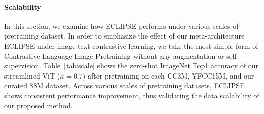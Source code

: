 \paragraph{Scalability}
In this section, we examine how ECLIPSE performs under various scales of pretraining dataset.
In order to emphasize the effect of our meta-architecture ECLIPSE under image-text contrastive learning, we take the most simple form of Contrastive Language-Image Pretraining without any augmentation or self-supervision.
Table~\ref{tab:scale} shows the zero-shot ImageNet Top1 accuracy of our streamlined ViT ($\kappa=0.7$) after pretraining on each CC3M, YFCC15M, and our curated 88M dataset.
Across various scales of pretraining datasets, ECLIPSE shows consistent performance improvement, thus validating the data scalability of our proposed method.